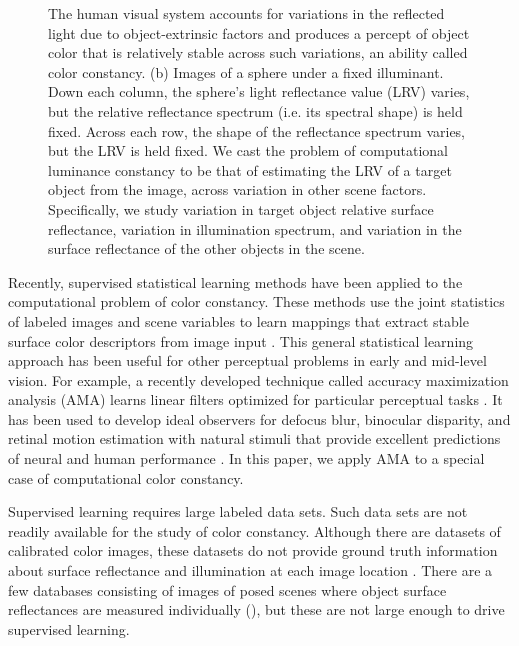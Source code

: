 \documentclass{jov}
\begin{document}
\begin{figure}
{The human visual system accounts for variations in the reflected light due to object-extrinsic factors and produces a percept of object color that is relatively stable across such variations, an ability called color constancy. 
(b) Images of a sphere under a fixed illuminant.  
Down each column, the sphere's light reflectance value (LRV) varies, but the relative reflectance spectrum (i.e. its spectral shape) is held fixed.
Across each row, the shape of the reflectance spectrum varies, but the LRV is held fixed.
We cast the problem of computational luminance constancy to be that of estimating the LRV of a target object from the image, across variation in other scene factors. 
Specifically, we study variation in target object relative surface reflectance, variation in illumination spectrum, and variation in the surface reflectance of the other objects in the scene.}
 \end{figure}

Recently, supervised statistical learning methods have been applied to the computational problem of color constancy.
These methods use the joint statistics of labeled images and scene variables to learn mappings that extract stable surface color descriptors from image input \cite{barron2015convolutional}.
This general statistical learning approach has been useful for other perceptual problems in early and mid-level vision.
For example, a recently developed technique called accuracy maximization analysis (AMA) learns linear filters optimized for particular perceptual tasks \cite{geisler2009optimal,burge2017accuracy,jaini2017linking}. It has been used to develop ideal observers for defocus blur, binocular disparity, and retinal motion estimation with natural stimuli that provide excellent predictions of neural and human performance \cite{burge2011optimal, burge2012optimal, burge2014optimal, burge2015optimal}.
In this paper, we apply AMA to a special case of computational color constancy. 

Supervised learning requires large labeled data sets.  Such data sets are not readily available for the study of color constancy. Although there are datasets of calibrated color images, these datasets do not provide ground truth information about surface reflectance and illumination at each image location \cite{ChakrabartiHyperspectral,NascimentoFoster2016,ParragaHyperspectralData,TkacikUpennHypersepctralData,skauli2013collection,olmos2004biologically}. There are a few databases consisting of images of posed scenes where object surface reflectances are measured individually (), but these are not large enough to drive supervised learning.
 
\end{document}
